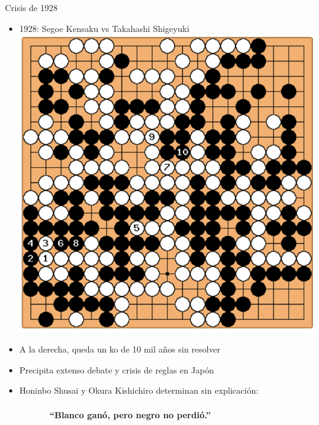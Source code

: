 \documentclass{beamer}
\begin{document}
\begin{frame}{Crisis de 1928}
  \begin{itemize}
    \item 1928: Segoe Kensaku vs Takahashi Shigeyuki
    \includegraphics[scale=0.15]{rulecrisis.png}
    \item A la derecha, queda un ko de 10 mil años sin resolver
    \item Precipita extenso debate y crisis de reglas en Japón
    \item Honinbo Shusai y Okura Kishichiro determinan sin explicación: \\
    \ \\
          \ \ \ \ \ \ \ \textbf{``Blanco ganó, pero negro no perdió.''}
  \end{itemize}

\end{frame}
\end{document}
